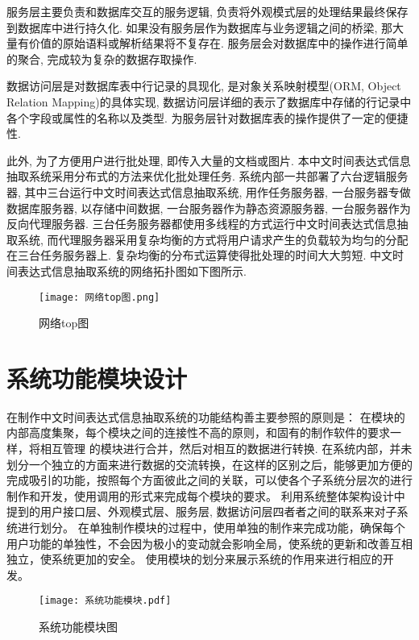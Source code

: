 服务层主要负责和数据库交互的服务逻辑, 负责将外观模式层的处理结果最终保存到数据库中进行持久化.
如果没有服务层作为数据库与业务逻辑之间的桥梁, 那大量有价值的原始语料或解析结果将不复存在.
服务层会对数据库中的操作进行简单的聚合, 完成较为复杂的数据存取操作.

数据访问层是对数据库表中行记录的具现化, 是对象关系映射模型(ORM, Object Relation Mapping)的具体实现, 数据访问层详细的表示了数据库中存储的行记录中各个字段或属性的名称以及类型.
为服务层针对数据库表的操作提供了一定的便捷性.

此外, 为了方便用户进行批处理, 即传入大量的文档或图片. 本中文时间表达式信息抽取系统采用分布式的方法来优化批处理任务.
系统内部一共部署了六台逻辑服务器, 其中三台运行中文时间表达式信息抽取系统, 用作任务服务器, 一台服务器专做数据库服务器, 以存储中间数据, 一台服务器作为静态资源服务器, 一台服务器作为反向代理服务器.
三台任务服务器都使用多线程的方式运行中文时间表达式信息抽取系统, 而代理服务器采用复杂均衡的方式将用户请求产生的负载较为均匀的分配在三台任务服务器上. 复杂均衡的分布式运算使得批处理的时间大大剪短.
中文时间表达式信息抽取系统的网络拓扑图如下图所示.

\begin{figure}[h]
  \centering
  \texttt{[image: 网络top图.png]}
  \caption{网络top图}
  \label{fig:badge}
\end{figure}

\section{系统功能模块设计}

在制作中文时间表达式信息抽取系统的功能结构善主要参照的原则是：
在模块的内部高度集聚，每个模块之间的连接性不高的原则，和固有的制作软件的要求一样，将相互管理
的模块进行合并，然后对相互的数据进行转换.
在系统内部，并未划分一个独立的方面来进行数据的交流转换，在这样的区别之后，能够更加方便的完成吸引的功能，按照每个方面彼此之间的关联，可以使各个子系统分层次的进行制作和开发，使用调用的形式来完成每个模块的要求。
利用系统整体架构设计中提到的用户接口层、外观模式层、服务层, 数据访问层四者者之间的联系来对子系统进行划分。
在单独制作模块的过程中，使用单独的制作来完成功能，确保每个用户功能的单独性，不会因为极小的变动就会影响全局，使系统的更新和改善互相独立，使系统更加的安全。
使用模块的划分来展示系统的作用来进行相应的开发。

\begin{figure}[h]
  \centering
  \texttt{[image: 系统功能模块.pdf]}
  \caption{系统功能模块图}
  \label{fig:badge}
\end{figure}

